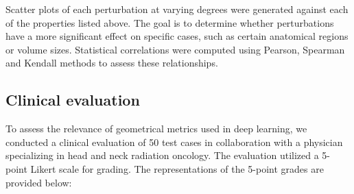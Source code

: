 Scatter plots of each perturbation at varying degrees were generated against each of the properties listed above. 
The goal is to determine whether perturbations have a more significant effect on specific cases, such as certain anatomical 
regions or volume sizes. Statistical correlations were computed using Pearson, Spearman and Kendall methods to assess 
these relationships.

\newpage
\subsection{Clinical evaluation}
To assess the relevance of geometrical metrics used in deep learning, we conducted a clinical evaluation of 50 test cases in collaboration with a 
physician specializing in head and neck radiation oncology. The evaluation utilized a 5-point Likert scale for grading. 
The representations of the 5-point grades are provided below:

